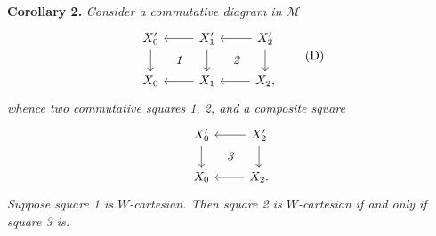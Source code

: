 \documentclass[11pt]{article}
\begin{document}
\textbf{Corollary 2.} \textit{Consider a commutative diagram in $\mathcal{M}$}
\[
\begin{tikzcd}[ampersand replacement=\&]
X_0' \arrow[d] \& X_1' \arrow[l] \arrow[d] \arrow[dl, phantom, "\textit{1}"] \& X_2' \arrow[l] \arrow[d] \arrow[dl, phantom, "\textit{2}"] \\
X_0 \& X_1 \arrow[l] \& X_2, \arrow[l]
\end{tikzcd}
\tag*{(D)}
\]
\textit{whence two commutative squares 1, 2, and a composite square}
\[
\begin{tikzcd}[ampersand replacement=\&]
X_0' \arrow[d] \& X_2' \arrow[l] \arrow[d] \arrow[dl, phantom, "\textit{3}"] \\
X_0 \& X_2. \arrow[l]
\end{tikzcd}
\]
\textit{Suppose square 1 is $W$-cartesian. Then square 2 is $W$-cartesian if and only if square 3 is.}
\end{document}

